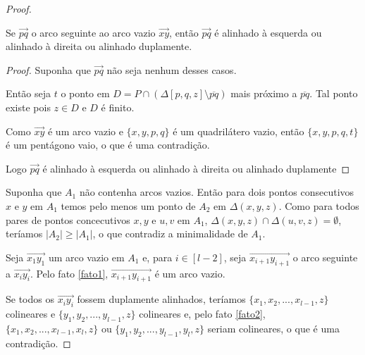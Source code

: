 \begin{proof}

    \begin{fato}\label{fato2}
        Se $\overrightarrow{pq}$ o arco seguinte ao arco vazio $\overrightarrow{xy}$, então $\overrightarrow{pq}$ é alinhado à esquerda ou alinhado à direita ou alinhado duplamente.
    \end{fato}
    \begin{proof}
        Suponha que $\overrightarrow{pq}$ não seja nenhum desses casos.

        Então seja $t$ o ponto em $D=P\cap(\Delta[p,q,z]\setminus\overline{pq})$ mais próximo a $\overline{pq}$. Tal ponto existe pois $z\in D$ e $D$ é finito.

        Como $\overrightarrow{xy}$ é um arco vazio e $\{x,y,p,q\}$ é um quadrilátero vazio, então $\{x,y,p,q,t\}$ é um pentágono vaio, o que é uma contradição.

        Logo $\overrightarrow{pq}$ é alinhado à esquerda ou alinhado à direita ou alinhado duplamente
    \end{proof}
    Suponha que $A_1$ não contenha arcos vazios. Então para dois pontos consecutivos $x$ e $y$ em $A_1$ temos pelo menos um ponto de $A_2$ em $\Delta(x,y,z)$. Como para todos pares de pontos concecutivos $x,y$ e $u,v$ em $A_1$, $\Delta(x,y,z)\cap\Delta(u,v,z)=\emptyset$, teríamos $|A_2|\geq|A_1|$, o que contradiz a minimalidade de $A_1$.

    Seja $\overrightarrow{x_1y_1}$ um arco vazio em $A_1$ e, para $i\in[l-2]$, seja $\overrightarrow{x_{i+1}y_{i+1}}$ o arco seguinte a $\overrightarrow{x_iy_i}$. Pelo fato \ref{fato1}, $\overrightarrow{x_{i+1}y_{i+1}}$ é um arco vazio.

    Se todos os $\overrightarrow{x_iy_i}$ fossem duplamente alinhados, teríamos $\{x_1,x_2,...,x_{l-1},z\}$ colineares e $\{y_1,y_2,...,y_{l-1},z\}$ colineares e, pelo fato \ref{fato2}, $\{x_1,x_2,...,x_{l-1},x_l,z\}$ ou $\{y_1,y_2,...,y_{l-1},y_l,z\}$ seriam colineares, o que é uma contradição.


\end{proof}
